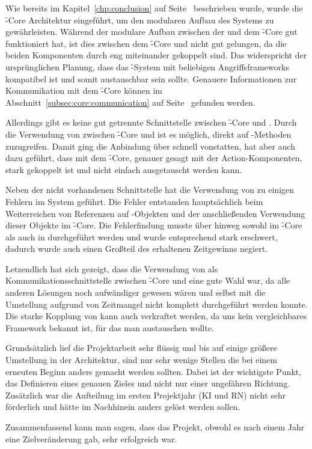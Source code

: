 Wie bereits im Kapitel~\ref{chp:conclusion} auf
Seite~\pageref{chp:conclusion} beschrieben wurde, wurde die
\f-Core Architektur eingeführt, um den modularen Aufbau des
Systems zu gewährleisten. Während der modulare Aufbau zwischen
der  und dem \f-Core gut funktioniert hat, ist dies zwischen
dem \f-Core und  nicht gut gelungen, da die beiden Komponenten
durch  eng miteinander gekoppelt sind. Das widerspricht der
ursprünglichen Planung, dass das \f-System mit
beliebigen Angriffsframeworks kompatibel ist und somit 
austauschbar sein sollte. Genauere Informationen zur Kommunikation mit dem
\f-Core können im Abschnitt~\ref{subsec:core:communication} auf
Seite~\pageref{subsec:core:communication} gefunden werden.

Allerdings gibt es keine gut getrennte
Schnittstelle zwischen \f-Core und . Durch die Verwendung von
 zwischen \f-Core und  ist es möglich, direkt auf
-Methoden zuzugreifen. Damit ging die Anbindung über 
schnell vonstatten, hat aber auch dazu geführt, dass  mit dem
\f-Core, genauer gesagt mit der Action-Komponenten, stark gekoppelt ist
und nicht einfach ausgetauscht werden kann.  

Neben der nicht vorhandenen Schnittstelle hat die Verwendung von 
zu einigen Fehlern im System geführt. Die Fehler entstanden
hauptsächlich beim Weiterreichen von Referenzen auf -Objekten und
der anschließenden Verwendung dieser Objekte im \f-Core. Die Fehlerfindung
musste über  hinweg sowohl im \f-Core als auch in 
durchgeführt werden und wurde entsprechend stark erschwert, dadurch wurde
auch einen Großteil des erhaltenen Zeitgewinns negiert.

Letzendlich hat sich gezeigt, dass die Verwendung
von  als Kommunikationsschnittstelle zwischen \f-Core und
 eine gute Wahl war, da alle anderen Lösungen noch
aufwändiger gewesen wären und selbst mit  die Umstellung aufgrund
von Zeitmangel nicht komplett durchgeführt werden konnte. Die
starke Kopplung von  kann auch verkraftet werden, da uns kein
vergleichbares Framework bekannt ist, für das man 
austauschen wollte.

Grundsätzlich lief die Projektarbeit sehr flüssig und bis auf einige
größere Umstellung in der Architektur, sind nur sehr wenige Stellen
die bei einem erneuten Beginn anders gemacht werden
sollten. Dabei ist der wichtigste Punkt, das Definieren eines genauen Zieles 
und nicht nur einer ungefähren Richtung. Zusätzlich war die Aufteilung im 
ersten Projektjahr (KI und RN) nicht sehr förderlich und hätte im Nachhinein 
anders gelöst werden sollen.

Zusammenfassend kann man sagen, dass
das Projekt, obwohl es nach einem Jahr eine Zielveränderung gab, sehr
erfolgreich war.